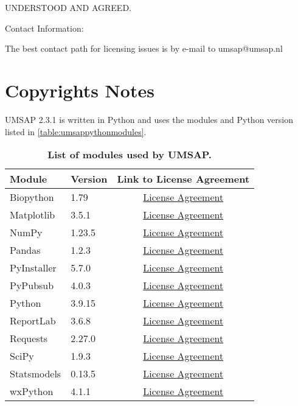 UNDERSTOOD AND AGREED.

Contact Information:

The best contact path for licensing issues is by e-mail to umsap@umsap.nl

\section{Copyrights Notes}

UMSAP \num[parse-numbers=false]{2.3.1} is written in Python and uses the modules
and Python version listed in \autoref{table:umsappythonmodules}.
\begin{table}[h!]
    \centering
    \begin{tabular}{llc}
        \hline
        Module & Version & Link to License Agreement\\
        \hline
        Biopython   & \num{1.79}                        & \href{https://github.com/biopython/biopython/blob/master/LICENSE.rst}{License Agreement}\\
        Matplotlib  & \num[parse-numbers=false]{3.5.1}  & \href{https://matplotlib.org/3.3.4/users/license.html}{License Agreement}\\
        NumPy       & \num[parse-numbers=false]{1.23.5} & \href{https://numpy.org/doc/stable/license.html}{License Agreement}\\
        Pandas      & \num[parse-numbers=false]{1.2.3}  & \href{https://pandas.pydata.org/docs/getting_started/overview.html#license}{License Agreement}\\
        PyInstaller & \num[parse-numbers=false]{5.7.0}  & \href{https://pyinstaller.org/en/stable/license.html}{License Agreement}\\
        PyPubsub    & \num[parse-numbers=false]{4.0.3}  & \href{https://pypubsub.readthedocs.io/en/v4.0.3/about.html}{License Agreement}\\
        Python      & \num[parse-numbers=false]{3.9.15} & \href{https://docs.python.org/3.9/license.html}{License Agreement}\\
        ReportLab   & \num[parse-numbers=false]{3.6.8}  & \href{https://www.reportlab.com/dev/docs/faq/#1.3}{License Agreement}\\
        Requests    & \num[parse-numbers=false]{2.27.0} & \href{https://github.com/psf/requests/blob/main/LICENSE}{License Agreement}\\
        SciPy       & \num[parse-numbers=false]{1.9.3}  & \href{https://github.com/scipy/scipy/blob/main/LICENSE.txt}{License Agreement}\\
        Statsmodels & \num[parse-numbers=false]{0.13.5} & \href{https://www.statsmodels.org/stable/dev/index.html#license}{License Agreement}\\
        wxPython    & \num[parse-numbers=false]{4.1.1}  & \href{https://wxpython.org/pages/license/index.html}{License Agreement}\\
        \hline
    \end{tabular}
    \caption[List of modules used by UMSAP]{\textbf{List of modules used by UMSAP.}}
    \label{table:umsappythonmodules}
\end{table}
\newpage